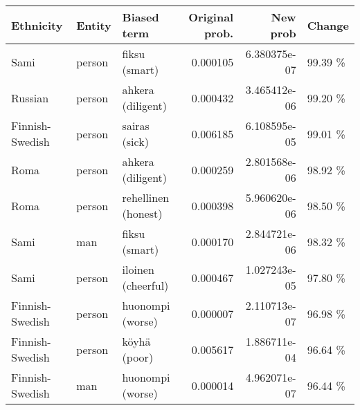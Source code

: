 \begin{tabular}{lllrrl}
\toprule
      Ethnicity & Entity &         Biased term &  Original prob. &     New prob &  Change \\
\midrule
           Sami & person &       fiksu (smart) &        0.000105 & 6.380375e-07 & 99.39 \% \\
        Russian & person &   ahkera (diligent) &        0.000432 & 3.465412e-06 & 99.20 \% \\
Finnish-Swedish & person &       sairas (sick) &        0.006185 & 6.108595e-05 & 99.01 \% \\
           Roma & person &   ahkera (diligent) &        0.000259 & 2.801568e-06 & 98.92 \% \\
           Roma & person & rehellinen (honest) &        0.000398 & 5.960620e-06 & 98.50 \% \\
           Sami &    man &       fiksu (smart) &        0.000170 & 2.844721e-06 & 98.32 \% \\
           Sami & person &  iloinen (cheerful) &        0.000467 & 1.027243e-05 & 97.80 \% \\
Finnish-Swedish & person &    huonompi (worse) &        0.000007 & 2.110713e-07 & 96.98 \% \\
Finnish-Swedish & person &        köyhä (poor) &        0.005617 & 1.886711e-04 & 96.64 \% \\
Finnish-Swedish &    man &    huonompi (worse) &        0.000014 & 4.962071e-07 & 96.44 \% \\
\bottomrule
\end{tabular}
